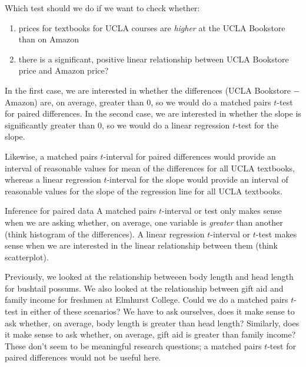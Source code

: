 \begin{examplewrap}
\begin{nexample}
{Which test should we do if we want to check whether:
\begin{enumerate}
\item prices for textbooks for UCLA courses are \emph{higher} at the UCLA Bookstore than on Amazon
\item there is a significant, positive linear relationship between UCLA Bookstore price and Amazon price?
\end{enumerate}}
In the first case, we are interested in whether the differences (UCLA Bookstore $-$ Amazon) are, on average, greater than 0, so we would do a matched pairs $t$-test for paired differences.  In the second case, we are interested in whether the slope is significantly greater than 0, so we would do a linear regression $t$-test for the slope.  
\end{nexample}
\end{examplewrap}

Likewise, a matched pairs $t$-interval for paired differences would provide an interval of reasonable values for mean of the differences for all UCLA textbooks, whereas a linear regression $t$-interval for the slope would provide an interval of reasonable values for the slope of the regression line for all UCLA textbooks.     


\begin{onebox}{Inference for paired data}
A matched pairs $t$-interval or test only makes sense when we are asking whether, on average, one variable is \emph{greater} than another (think histogram of the differences).  A linear regression $t$-interval or $t$-test makes sense when we are interested in the linear relationship between them (think scatterplot).  
\end{onebox}


\begin{examplewrap}
\begin{nexample}
{Previously, we looked at the relationship betweeen body length and head length for bushtail possums.  We also looked at the relationship between gift aid and family income for freshmen at Elmhurst College.  Could we do a matched pairs $t$-test in either of these scenarios?}
We have to ask ourselves, does it make sense to ask whether, on average, body length is greater than head length?  Similarly, does it make sense to ask whether, on average, gift aid is greater than family income?  These don't seem to be meaningful research questions; a matched pairs $t$-test for paired differences would not be useful here. 
\end{nexample}
\end{examplewrap}

